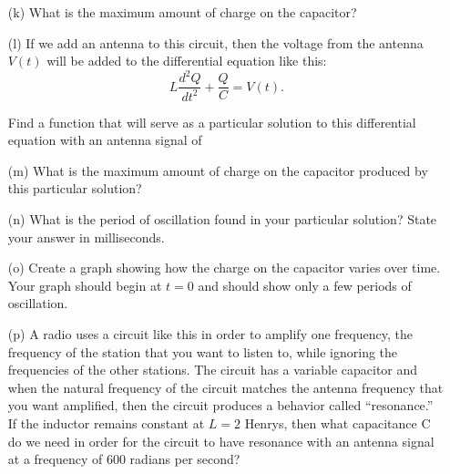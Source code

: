 \begin{problem}
\begin{enumerate}
        \item[(k)] What is the maximum amount of charge on the capacitor?
        \item[(l)] If we add an antenna to this circuit, then the voltage from the antenna
            $V(t)$ will be added to the differential equation like this:
            \[ L \frac{d^2 Q}{dt^2} + \frac{Q}{C} = V(t). \]

            Find a function that will serve as a particular solution to this differential
            equation with an antenna signal of   
        \item[(m)] What is the maximum amount of charge on the capacitor produced by this
            particular solution?
        \item[(n)] What is the period of oscillation found in your particular solution?
            State your answer in milliseconds.
        \item[(o)] Create a graph showing how the charge on the capacitor varies over time.
            Your graph should begin at $t = 0$ and should show only a few periods of
            oscillation.
        \item[(p)] A radio uses a circuit like this in order to amplify one frequency, the
            frequency of the station that you want to listen to, while ignoring the
            frequencies of the other stations.  The circuit has a variable capacitor and
            when the natural frequency of the circuit matches the antenna frequency that
            you want amplified, then the circuit produces a behavior called “resonance.”
            If the inductor remains constant at $L=2$  Henrys, then what capacitance C do we
            need in order for the circuit to have resonance with an antenna signal at a
            frequency of 600 radians per second?
    \end{enumerate}
\end{problem}
